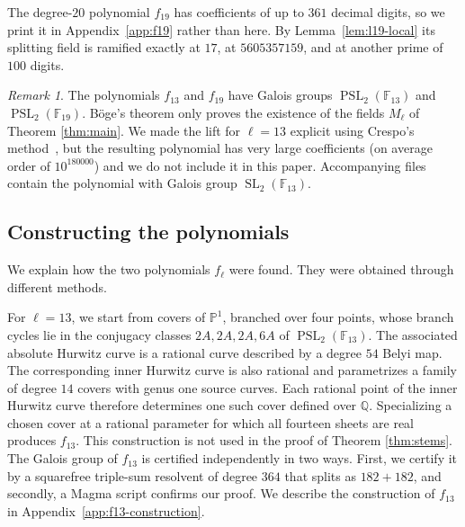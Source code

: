\documentclass[10pt]{amsart}
\numberwithin{equation}{section}
\theoremstyle{definition}
\theoremstyle{remark}
\newtheorem{remark}[theorem]{Remark}
\newcommand{\PP}{\mathbb P}
\newcommand{\F}{\mathbb{F}}
\newcommand{\Q}{\mathbb{Q}}
\newcommand{\SL}{\operatorname{SL}}
\newcommand{\PSL}{\operatorname{PSL}}
\begin{document}
The degree-$20$ polynomial $f_{19}$ has coefficients of up to $361$ decimal
digits, so we print it in Appendix~\ref{app:f19} rather than here.  By
Lemma~\ref{lem:l19-local} its splitting field is ramified exactly at $17$, at
$5605357159$, and at another prime of $100$ digits.

\begin{remark}\label{rem:not-claimed}
The polynomials $f_{13}$ and $f_{19}$ have Galois groups $\PSL_2(\F_{13})$ and $\PSL_2(\F_{19})$.  B\"oge's theorem only proves the existence of the fields $M_\ell$ of Theorem \ref{thm:main}. We made the lift for $\ell=13$ explicit using Crespo's
method~\cite{Crespo1997}, but the resulting polynomial has very large coefficients (on average order of $10^{180000}$) and we do not include it in this paper. Accompanying files contain the polynomial with Galois group $\SL_2(\F_13)$. 
\end{remark}



\subsection{Constructing the polynomials}\label{subsec:intro-constructions}
We explain how the two polynomials $f_\ell$ were found. They were obtained through different methods.

For $\ell=13$, we start from covers of $\PP^1$, branched over four points, whose branch
cycles lie in the conjugacy classes $2A,2A,2A,6A$ of $\PSL_2(\F_{13})$.  The associated absolute Hurwitz curve is a rational curve described by a degree $54$ Belyi map. The corresponding inner Hurwitz curve is also rational and parametrizes a family of degree $14$ covers with genus one source curves. Each rational point of the inner Hurwitz curve
  therefore determines one such cover defined over $\Q$. Specializing a chosen cover at a rational parameter for which all fourteen sheets are real produces $f_{13}$.  This construction is not used in the proof of Theorem \ref{thm:stems}. The Galois group of
$f_{13}$ is certified independently in two ways. First, we certify it by a squarefree
triple-sum resolvent of degree $364$ that splits as $182+182$, and secondly, a Magma script confirms our proof. We describe
the construction of $f_{13}$ in Appendix~\ref{app:f13-construction}.
\end{document}
